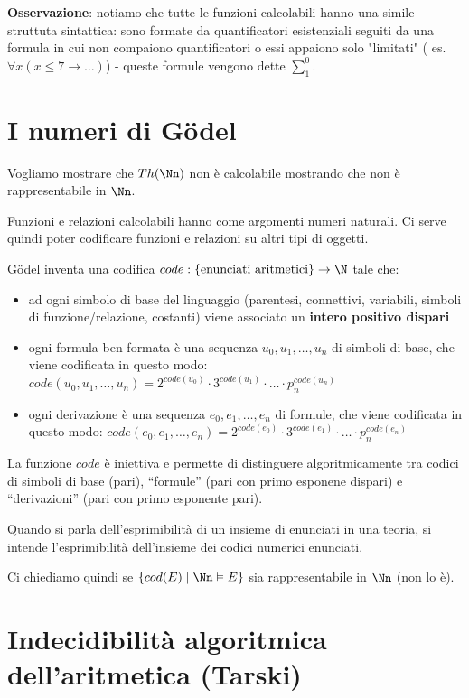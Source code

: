 \documentclass[a4paper,11pt]{report}
\begin{document}
\textbf{Osservazione}: notiamo che tutte le funzioni calcolabili hanno una simile struttuta sintattica: sono formate da quantificatori esistenziali seguiti da una formula in cui non compaiono quantificatori o essi appaiono solo "limitati" ( es. \( \forall x (x\leq 7 \to \dots) \)) - queste formule vengono dette \( \sum_1^0 \).

\section{I numeri di Gödel}
{\color{gray} \small Vogliamo mostrare che \( Th(\Nn) \) non è calcolabile mostrando che non è rappresentabile in \( \Nn \).}

Funzioni e relazioni calcolabili hanno come argomenti numeri naturali. Ci serve quindi poter codificare funzioni e relazioni su altri tipi di oggetti.

Gödel inventa una codifica \( code: \{\text{enunciati aritmetici}\} \to \N \) tale che:
\begin{itemize}
    \item ad ogni simbolo di base del linguaggio (parentesi, connettivi, variabili, simboli di funzione/relazione, costanti) viene associato un \textbf{intero positivo dispari}
    \item ogni formula ben formata è una sequenza \( u_0, u_1, \dots, u_n \) di simboli di base, che viene codificata in questo modo:
        \subitem \( code(u_0, u_1, \dots, u_n) = 2^{code(u_0)} \cdot 3^{code(u_1)} \cdot \ldots \cdot p_n^{code(u_n)} \)
    \item ogni derivazione è una sequenza \( e_0, e_1, \dots, e_n \) di formule, che viene codificata in questo modo:
        \subitem \( code(e_0, e_1, \dots, e_n) = 2^{code(e_0)} \cdot 3^{code(e_1)} \cdot \ldots \cdot p_n^{code(e_n)} \)
\end{itemize}

La funzione \( code \) è iniettiva e permette di distinguere algoritmicamente tra codici di simboli di base (pari), ``formule'' (pari con primo esponene dispari) e ``derivazioni'' (pari con primo esponente pari).

Quando si parla dell'esprimibilità di un insieme di enunciati in una teoria, si intende l'esprimibilità dell'insieme dei codici numerici enunciati.

Ci chiediamo quindi se \( \{cod(E) \mid \Nn \vDash E\} \) sia rappresentabile in \( \Nn \) {\color{gray}\small (non lo è)}.

\section{Indecidibilità algoritmica dell'aritmetica (Tarski)}
\end{document}
